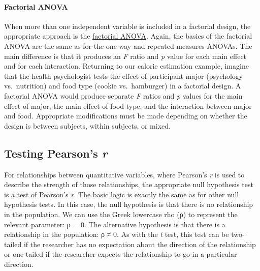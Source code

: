 \documentclass[
]{krantz}
\begin{document}
\paragraph*{Factorial ANOVA}\label{factorial-anova}

When more than one independent variable is included in a factorial design, the appropriate approach is the \hyperref[factorial-anova]{factorial ANOVA}. Again, the basics of the factorial ANOVA are the same as for the one-way and repeated-measures ANOVAs. The main difference is that it produces an \emph{F} ratio and \emph{p} value for each main effect and for each interaction. Returning to our calorie estimation example, imagine that the health psychologist tests the effect of participant major (psychology vs.~nutrition) and food type (cookie vs.~hamburger) in a factorial design. A factorial ANOVA would produce separate \emph{F} ratios and \emph{p} values for the main effect of major, the main effect of food type, and the interaction between major and food. Appropriate modifications must be made depending on whether the design is between subjects, within subjects, or mixed.

\subsection*{\texorpdfstring{Testing Pearson's \emph{r}}{Testing Pearson's r}}\label{testing-pearsons-r}


For relationships between quantitative variables, where Pearson's \emph{r} is used to describe the strength of those relationships, the appropriate null hypothesis test is a test of Pearson's \emph{r.} The basic logic is exactly the same as for other null hypothesis tests. In this case, the null hypothesis is that there is no relationship in the population. We can use the Greek lowercase rho (ρ) to represent the relevant parameter: ρ = 0. The alternative hypothesis is that there is a relationship in the population: ρ ≠ 0. As with the \emph{t} test, this test can be two-tailed if the researcher has no expectation about the direction of the relationship or one-tailed if the researcher expects the relationship to go in a particular direction.
\end{document}
